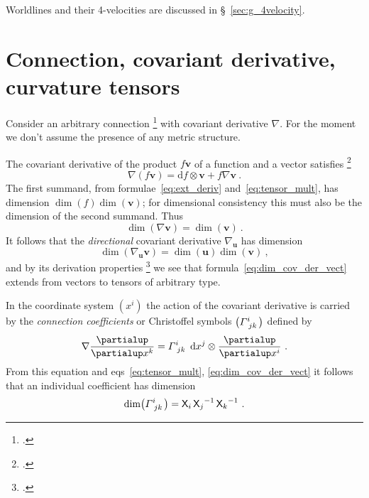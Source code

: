 \documentclass[\ifafour a4paper,12pt,\else a5paper,10pt,\fi%
onecolumn,oneside,article,%
british%
]{memoir}
\theoremstyle{remark}
\theoremstyle{innote}
\newcommand*{\citep}{\footcites}
\newcommand*{\de}{\partialup}%
\newcommand*{\di}{\mathrm{d}}%
\renewcommand*{\|}[1][]{\nonscript\,#1\vert\nonscript\;\mathopen{}}
\newcommand*{\sect}{\S}%
\newcommand*{\eqns}{eqs}%
\newcommand*{\Xx}{\textsf{X}}
\newcommand*{\yv}{\bm{v}}
\newcommand*{\yu}{\bm{u}}
\renewcommand*{\i}{\indices}
\newcommand*{\dex}[1][i]{\frac{\de}{\de x^{#1}}}
\newcommand*{\dix}[1][i]{\di x^{#1}}
\newcommand*{\nab}{\nabla}
\newcommand*{\yGa}{\varGamma}
\begin{document}
Worldlines and their 4-velocities are discussed in \sect~\ref{sec:g_4velocity}.




\section{Connection, covariant derivative, curvature tensors}
\label{sec:connection}

Consider an arbitrary connection
\citep[\sect~V.B]{choquetbruhatetal1977_r1996} with covariant derivative
$\nab$. For the moment we don't assume the presence of any metric
structure.

The covariant derivative of the product $f\yv$ of a function and a vector
satisfies \citep[\sect~V.B.1]{choquetbruhatetal1977_r1996}
\begin{equation}
  \label{eq:basic_property_covder}
  \nab(f\yv) = \di f \otimes \yv + f\nab\yv\ .
\end{equation}
The first summand, from formulae~\eqref{eq:ext_deriv}
and~\eqref{eq:tensor_mult}, has dimension $\dim(f)\dim(\yv)$; for
dimensional consistency this must also be the dimension of the second
summand. Thus
\begin{equation}
  \label{eq:dim_cov_der_vect}
  \dim(\nab\yv) = \dim(\yv)\ .
\end{equation}
It follows that the \emph{directional} covariant derivative $\nab_{\yu}$
has dimension
\begin{equation}
  \label{eq:dim_dircov_der_vect}
  \dim(\nab_{\yu}\yv) = \dim(\yu)\dim(\yv)\ ,
\end{equation}
and by its derivation properties \citep[\sect~V.B.1
p.~303]{choquetbruhatetal1977_r1996} we see that
formula~\eqref{eq:dim_cov_der_vect} extends from vectors to 
tensors of arbitrary type.

\medskip

In the coordinate system $(x^{i})$ the action of the covariant derivative
is carried by the \emph{connection coefficients} or Christoffel symbols
$\bigl(\yGa\i{^{i}_{jk}}\bigr)$ defined by
\begin{equation}
  \label{eq:christoffel}
  \nab\dex[k] = \yGa\i{^{i}_{jk}}\  \dix[j]\otimes\dex[i]\ .
\end{equation}
From this equation and \eqns~\eqref{eq:tensor_mult},
\eqref{eq:dim_cov_der_vect} it follows that an individual coefficient has
dimension
\begin{equation}
  \label{eq:dim_christoffel}
  \dim\bigl(\yGa\i{^{i}_{jk}}\bigr) = \Xx_{i}\, {\Xx_{j}}^{-1}\,{\Xx_{k}}^{-1}\ .
\end{equation}
\end{document}
